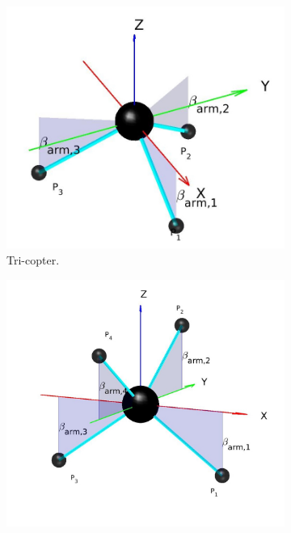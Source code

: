 \begin{figure}[!ht]
  \begin{subfigure}[b]{0.48\textwidth}
    \includegraphics[width=\linewidth]{images/Tricopter.jpg}
    \caption{Tri-copter.} \label{fig:comp_tri}
  \end{subfigure}
  \hspace*{\fill} %
  \begin{subfigure}[b]{0.48\textwidth}
    \includegraphics[width=\linewidth]{images/Quadcopter.jpg}

\end{subfigure}
\end{figure}
